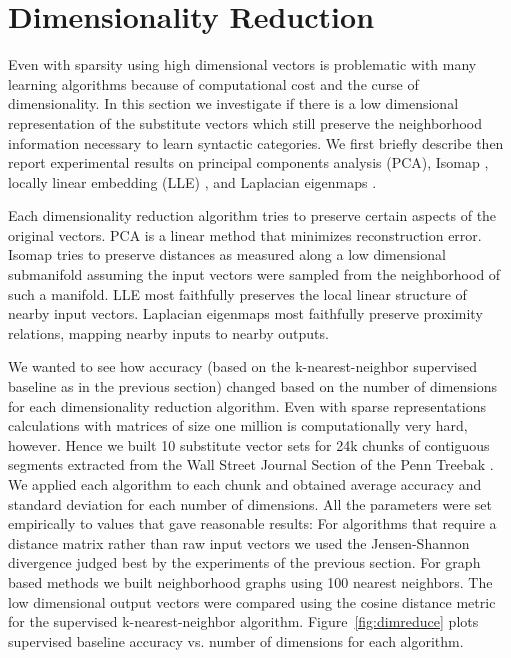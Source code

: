 \section{Dimensionality Reduction}
\label{sec:dimreduce}

Even with sparsity using high dimensional vectors is problematic with
many learning algorithms because of computational cost and the curse
of dimensionality.  In this section we investigate if there is a low
dimensional representation of the substitute vectors which still
preserve the neighborhood information necessary to learn syntactic
categories.  We first briefly describe then report experimental
results on principal components analysis (PCA), Isomap
\cite{tenenbaum2000global}, locally linear embedding (LLE)
\cite{roweis2000nonlinear}, and Laplacian eigenmaps
\cite{belkin2003laplacian}.

Each dimensionality reduction algorithm tries to preserve certain
aspects of the original vectors.  PCA is a linear method that
minimizes reconstruction error.  Isomap tries to preserve distances as
measured along a low dimensional submanifold assuming the input
vectors were sampled from the neighborhood of such a manifold.  LLE
most faithfully preserves the local linear structure of nearby input
vectors.  Laplacian eigenmaps most faithfully preserve proximity
relations, mapping nearby inputs to nearby outputs.

We wanted to see how accuracy (based on the k-nearest-neighbor
supervised baseline as in the previous section) changed based on the
number of dimensions for each dimensionality reduction algorithm.  
%
Even with sparse representations calculations with matrices of size
one million is computationally very hard, however.  Hence we built 10
substitute vector sets for 24k chunks of contiguous segments extracted
from the Wall Street Journal Section of the Penn Treebak
\cite{treebank3}.  We applied each algorithm to each chunk and
obtained average accuracy and standard deviation for each number of
dimensions.
%
All the parameters were set empirically to values that gave
reasonable results: For algorithms that require a distance matrix
rather than raw input vectors we used the Jensen-Shannon divergence
judged best by the experiments of the previous section.  For graph
based methods we built neighborhood graphs using 100 nearest
neighbors.  The low dimensional output vectors were compared using the
cosine distance metric for the supervised k-nearest-neighbor
algorithm.  Figure~\ref{fig:dimreduce} plots supervised baseline
accuracy vs. number of dimensions for each algorithm.

